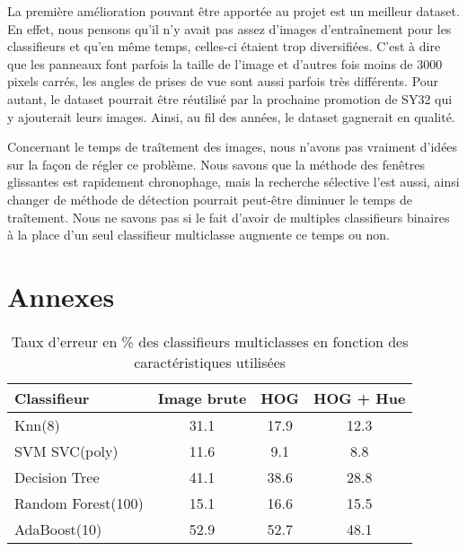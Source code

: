 \documentclass[a4paper,11pt]{article}
\begin{document}
La première amélioration pouvant être apportée au projet est un meilleur dataset. En effet, nous pensons qu'il n'y avait pas assez d'images d'entraînement pour les classifieurs et qu'en même temps, celles-ci étaient trop diversifiées. C'est à dire que les panneaux font parfois la taille de l'image et d'autres fois moins de 3000 pixels carrés, les angles de prises de vue sont aussi parfois très différents. Pour autant, le dataset pourrait être réutilisé par la prochaine promotion de SY32 qui y ajouterait leurs images. Ainsi, au fil des années, le dataset gagnerait en qualité.

\vspace{2mm}

\noindent Concernant le temps de traîtement des images, nous n'avons pas vraiment d'idées sur la façon de régler ce problème. Nous savons que la méthode des fenêtres glissantes est rapidement chronophage, mais la recherche sélective l'est aussi, ainsi changer de méthode de détection pourrait peut-être diminuer le temps de traîtement. Nous ne savons pas si le fait d'avoir de multiples classifieurs binaires à la place d'un seul classifieur multiclasse augmente ce temps ou non. 

\newpage
\section{Annexes}

\captionsetup[table]{labelformat=simple, labelsep=colon, name=Annexe, justification=centering}


\begin{table}[H]
\centering
\begin{tabular}{lccc}
\toprule
\textbf{Classifieur} & \textbf{Image brute} & \textbf{HOG} & \textbf{HOG + Hue} \\
\midrule
Knn(8) & 31.1 & 17.9 & 12.3 \\
SVM SVC(poly) & 11.6 & 9.1 & 8.8 \\
Decision Tree & 41.1 & 38.6 & 28.8 \\
Random Forest(100) & 15.1 & 16.6 & 15.5 \\
AdaBoost(10) & 52.9 & 52.7 & 48.1 \\
\bottomrule
\end{tabular}
\caption{Taux d'erreur en \% des classifieurs multiclasses en fonction des caractéristiques utilisées}
\label{tab:classification-results}
\end{table}
\end{document}
